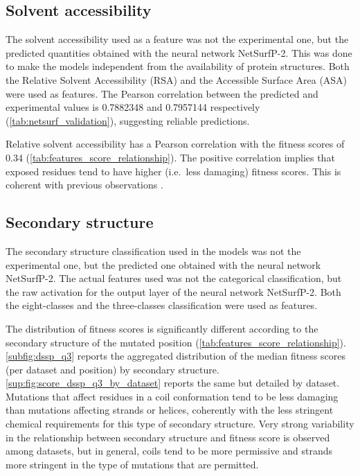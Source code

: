 \subsection{Solvent accessibility}
The solvent accessibility used as a feature was not the experimental one, but the predicted quantities obtained with the neural network NetSurfP-2.
This was done to make the models independent from the availability of protein structures.
Both the Relative Solvent Accessibility (RSA) and the Accessible Surface Area (ASA) were used as features.
The Pearson correlation between the predicted and experimental values is \num{0.7882348} and \num{0.7957144} respectively (\autoref{tab:netsurf_validation}), suggesting reliable predictions.

Relative solvent accessibility has a Pearson correlation with the fitness scores of \num{0.34} (\autoref{tab:features_score_relationship}).
The positive correlation implies that exposed residues tend to have higher (i.e.\ less damaging) fitness scores.
This is coherent with previous observations \parencite{Savojardo2021}.

\subsection{Secondary structure}
The secondary structure classification used in the models was not the experimental one, but the predicted one obtained with the neural network NetSurfP-2.
The actual features used was not the categorical classification, but the raw activation for the output layer of the neural network NetSurfP-2.
Both the eight-classes and the three-classes classification were used as features.

The distribution of fitness scores is significantly different according to the secondary structure of the mutated position (\autoref{tab:features_score_relationship}).
\autoref{subfig:dssp_q3} reports the aggregated distribution of the median fitness scores (per dataset and position) by secondary structure.
\autoref{sup:fig:score_dssp_q3_by_dataset} reports the same but detailed by dataset.
Mutations that affect residues in a coil conformation tend to be less damaging than mutations affecting strands or helices, coherently with the less stringent chemical requirements for this type of secondary structure.
Very strong variability in the relationship between secondary structure and fitness score is observed among datasets, but in general, coils tend to be more permissive and strands more stringent in the type of mutations that are permitted.

